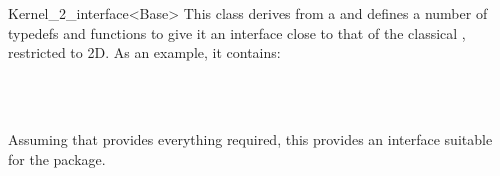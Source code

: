 \begin{ccRefClass}{Kernel_2_interface<Base>}
\ccDefinition
This class derives from a   and defines a number
of typedefs and functions to give it an interface close to that of the
classical , restricted to 2D. As an example, it contains:

\\
\\

Assuming that  provides everything required, this provides
an interface suitable for the  package.

\end{ccRefClass}
